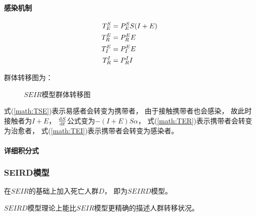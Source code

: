 \paragraph{感染机制}
\begin{align}
    T^{S}_{E}&=P^{S}_{E}S(I+E) \label{math:TSE} \\
    T^{E}_{R}&=P^{E}_{R}E     \label{math:TER}  \\
    T^{E}_{I}&=P^{E}_{I}E     \label{math:TEI}  \\
    T^{I}_{R}&=P^{I}_{R}I
\end{align}
\par 群体转移图为：
\begin{figure}[H]
    \centering
    \caption{$SEIR$模型群体转移图}
\end{figure}
\par 式(\ref{math:TSE})表示易感者会转变为携带者，
由于接触携带者也会感染，
故此时接触者为$I+E$，
$\frac{\mathrm{d}S}{\mathrm{d}t}$公式变为$-(I+E)S\alpha$，
式(\ref{math:TER})表示携带者会转变为治愈者，
式(\ref{math:TEI})表示携带者会转变为感染者。
\paragraph{详细积分式}
\SEIR
\subsubsection{SEIRD模型}
\par 在$SEIR$的基础上加入死亡人群$D$，
即为$SEIRD$模型。
\par $SEIRD$模型理论上能比$SEIR$模型更精确的描述人群转移状况。
